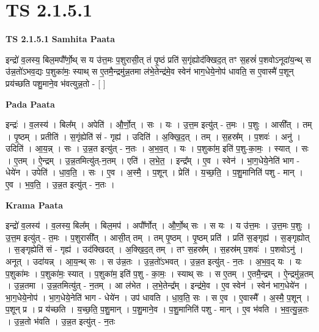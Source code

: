 \documentclass[17pt]{extarticle}
\begin{document}
\section{ TS 2.1.5.1 }

\textbf{TS 2.1.5.1 } \newline
\textbf{Samhita Paata} \newline

इन्द्रो॑ व॒लस्य॒ बिल॒मपौ᳚र्णो॒थ् स य उ॑त्त॒मः प॒शुरासी॒त् तं पृ॒ष्ठं प्रति॑ स॒गृंह्योद॑क्खिद॒त् तꣳ स॒हस्रं॑ प॒शवोऽनूदा॑य॒न्थ् स उ॑न्न॒तो॑ऽभव॒द्यः प॒शुका॑मः॒ स्याथ् स ए॒तमै॒न्द्रमु॑न्न॒तमा ल॑भे॒तेन्द्र॑मे॒व स्वेन॑ भाग॒धेये॒नोप॑ धावति॒ स ए॒वास्मै॑ प॒शून् प्रय॑च्छति पशु॒माने॒व भ॑वत्युन्न॒तो -  [  ] \newline

\textbf{Pada Paata} \newline

इन्द्रः॑ । व॒लस्य॑ । बिल᳚म् । अपेति॑ । औ॒र्णो॒त् । सः । यः । उ॒त्त॒म इत्यु॑त् - त॒मः । प॒शुः । आसी᳚त् । तम् । पृ॒ष्ठम् । प्रतीति॑ । स॒गृंह्येति॑ सं - गृह्य॑ । उदिति॑ । अ॒क्खि॒द॒त् । तम् । स॒हस्र᳚म् । प॒शवः॑ । अनु॑ । उदिति॑ । आ॒य॒न्न् । सः । उ॒न्न॒त इत्यु॑त् - न॒तः । अ॒भ॒व॒त् । यः । प॒शुका॑म॒ इति॑ प॒शु-का॒मः॒ । स्यात् । सः । ए॒तम् । ऐ॒न्द्रम् । उ॒न्न॒तमित्यु॑त्-न॒तम् । एति॑ । ल॒भे॒त॒ । इन्द्र᳚म् । ए॒व । स्वेन॑ । भा॒ग॒धेये॒नेति॑ भाग - धेये॑न । उपेति॑ । धा॒व॒ति॒ । सः । ए॒व । अ॒स्मै॒ । प॒शून् । प्रेति॑ । य॒च्छ॒ति॒ । प॒शु॒मानिति॑ पशु - मान् । ए॒व । भ॒व॒ति॒ । उ॒न्न॒त इत्यु॑त् - न॒तः ।  \newline


\textbf{Krama Paata} \newline

इन्द्रो॑ व॒लस्य॑ । व॒लस्य॒ बिल᳚म् । बिल॒मप॑ । अपौ᳚र्णोत् । औ॒र्णो॒थ् सः । स यः । य उ॑त्त॒मः । उ॒त्त॒मः प॒शुः । उ॒त्त॒म इत्यु॑त् - त॒मः । प॒शुरासी᳚त् । आसी॒त् तम् । तम् पृ॒ष्ठम् । पृ॒ष्ठम् प्रति॑ । प्रति॑ स॒ङ्गृह्य॑ । स॒ङ्गृह्योत् । स॒ङ्गृह्येति॑ सं - गृह्य॑ । उद॑क्खिदत् । अ॒क्खि॒द॒त् तम् । तꣳ स॒हस्र᳚म् । स॒हस्र॑म् प॒शवः॑ । प॒शवोऽनु॑ । अनूत् । उदा॑यन्न् । आ॒य॒न्थ् सः । स उ॑न्न॒तः । उ॒न्न॒तो॑ऽभवत् । उ॒न्न॒त इत्यु॑त् - न॒तः । अ॒भ॒व॒द् यः । यः प॒शुका॑मः । प॒शुका॑मः॒ स्यात् । प॒शुका॑म॒ इति॑ प॒शु - का॒मः॒ । स्याथ् सः । स ए॒तम् । ए॒तमै॒न्द्रम् । ऐ॒न्द्रमु॑न्न॒तम् । उ॒न्न॒तमा । उ॒न्न॒तमित्यु॑त् - न॒तम् । आ ल॑भेत । ल॒भे॒तेन्द्र᳚म् । इन्द्र॑मे॒व । ए॒व स्वेन॑ । स्वेन॑ भाग॒धेये॑न । भा॒ग॒धेये॒नोप॑ । भा॒ग॒धेये॒नेति॑ भाग - धेये॑न । उप॑ धावति । धा॒व॒ति॒ सः । स ए॒व । ए॒वास्मै᳚ । अ॒स्मै॒ प॒शून् । प॒शून् प्र । प्र य॑च्छति । य॒च्छ॒ति॒ प॒शु॒मान् । प॒शु॒माने॒व । प॒शु॒मानिति॑ पशु - मान् । ए॒व भ॑वति । भ॒व॒त्यु॒न्न॒तः । उ॒न्न॒तो भ॑वति । उ॒न्न॒त इत्यु॑त् - न॒तः \newline
\end{document}
